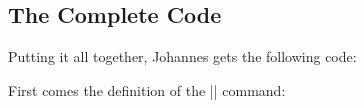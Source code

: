 \subsection{The Complete Code}

Putting it all together, Johannes gets the following code:

First comes the definition of the |\lecture| command:
%
\begin{codeexample}
\def\lecture#1#2#3#4#5#6{
  \node [annotation, #3, scale=0.65, text width=4cm, inner sep=2mm, fill=white] at (#4) {
    Lecture #1: \textcolor{orange}{\textbf{#2}}
    \list{--}{\topsep=2pt\itemsep=0pt\parsep=0pt
              \parskip=0pt\labelwidth=8pt\leftmargin=8pt
              \itemindent=0pt\labelsep=2pt}
    #5
    \endlist
  };
  \node [anchor=base west] at (cal-#6.base east) {\textcolor{orange}{\textbf{#2}}};
}
\end{codeexample}


